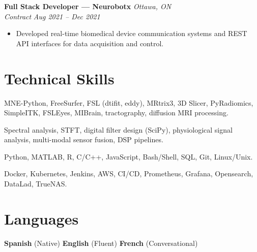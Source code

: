 \documentclass[11pt, letterpaper]{article}
\newcommand{\cventry}[4]{
    \noindent\textbf{#1} \hfill \textit{#2} \\
    \textit{#3} \hfill \textit{\small #4} \\
    \vspace{-4pt}
}
\begin{document}
\cventry{Full Stack Developer --- Neurobotx}{Ottawa, ON}{Contract}{Aug 2021 -- Dec 2021}

\begin{itemize}[leftmargin=1.5em, topsep=2pt, itemsep=0pt]
    \item Developed real-time biomedical device communication systems and REST API interfaces for data acquisition and control.
\end{itemize}

\section{Technical Skills}

\begin{description}[style=multiline, leftmargin=3.5cm, font=\bfseries, itemsep=3pt]

    \item[Neuroimaging] MNE-Python, FreeSurfer, FSL (dtifit, eddy), MRtrix3, 3D Slicer, PyRadiomics, SimpleITK, FSLEyes, MIBrain, tractography, diffusion MRI processing.

 
    \item[Signal Processing] Spectral analysis, STFT, digital filter design (SciPy), physiological signal analysis, multi-modal sensor fusion, DSP pipelines.

    \item[Programming] Python, MATLAB, R, C/C++, JavaScript, Bash/Shell, SQL, Git, Linux/Unix.

    \item[Infrastructure \& DevOps] Docker, Kubernetes, Jenkins, AWS, CI/CD, Prometheus, Grafana, Opensearch, DataLad, TrueNAS.

\end{description}

\section{Languages}

\noindent
\textbf{Spanish} (Native)
\quad\textbar\quad
\textbf{English} (Fluent)
\quad\textbar\quad
\textbf{French} (Conversational)
\hfill
\end{document}
